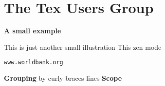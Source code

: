 \documentclass{article}
\newcommand{\TUG}{Tex Users Group}
\newcommand{\keyword}[1]{\textbf{#1}}
\begin{document}
\section{The \TUG}

\begin{huge}
\bfseries
A small example
\end{huge}

\bigskip
This is just another small illustration
This zen mode

\texttt{www.worldbank.org}

\keyword{Grouping} by curly braces lines
\keyword{Scope}
\end{document}
